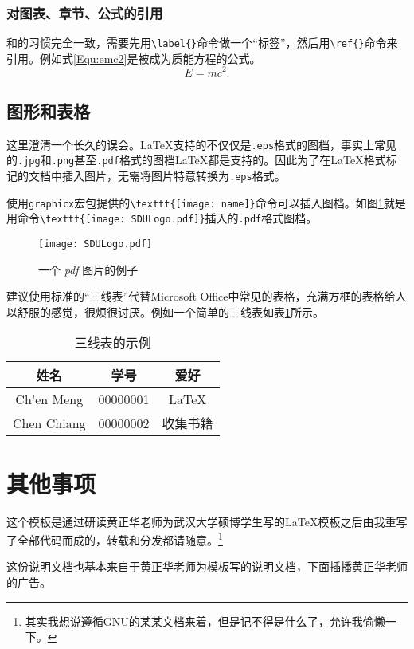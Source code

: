 \subsection{对图表、章节、公式的引用}
和\LaTeXe{}的习惯完全一致，需要先用\verb|\label{}|命令做一个“标签”，然后用\verb|\ref{}|命令来引用。例如式\ref{Equ:emc2}是被成为质能方程的公式。
\begin{equation}
E = m c^2.
\label{Equ:emc2}
\end{equation}
\section{图形和表格}
这里澄清一个长久的误会。\LaTeX{}支持的不仅仅是\texttt{.eps}格式的图档，事实上常见的\texttt{.jpg}和\texttt{.png}甚至\texttt{.pdf}格式的图档\LaTeX{}都是支持的。因此为了在\LaTeX{}格式标记的文档中插入图片，无需将图片特意转换为\texttt{.eps}格式。

使用\texttt{graphicx}宏包提供的\verb|\texttt{[image: name]}|命令可以插入图档。如图\ref{Fig:pdf}就是用命令\verb|\texttt{[image: SDULogo.pdf]}|插入的\texttt{.pdf}格式图档。
\begin{figure}
[htbp]
\centering
\texttt{[image: SDULogo.pdf]}
\caption{一个 \emph{pdf} 图片的例子}\label{Fig:pdf}
\end{figure}

建议使用标准的“三线表”代替Microsoft Office中常见的表格，充满方框的表格给人以舒服的感觉，很烦很讨厌。例如一个简单的三线表如表\ref{Tab:3lines}所示。
\begin{table}
[htbp]
\centering
\caption{三线表的示例}\label{Tab:3lines}
\begin{tabular}
{ccc}
\toprule
姓名& 学号& 爱好\\
\hline
Ch'en Meng& 00000001& \LaTeX{}\\
Chen Chiang& 00000002& 收集书籍\\
\bottomrule
\end{tabular}
\end{table}
\chapter{其他事项}
这个模板是通过研读黄正华老师为武汉大学硕博学生写的\LaTeX{}模板之后由我重写了全部代码而成的，转载和分发都请随意。\footnote{其实我想说遵循GNU的某某文档来着，但是记不得是什么了，允许我偷懒一下。}

这份说明文档也基本来自于黄正华老师为模板写的说明文档，下面插播黄正华老师的广告。


